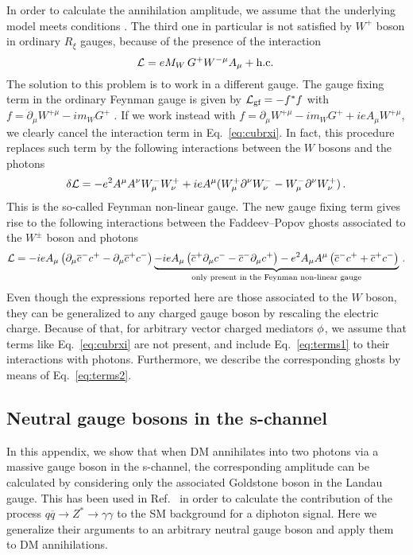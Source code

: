 In order to calculate the annihilation amplitude, we assume that the underlying model meets conditions \cond. The third one in particular is not satisfied by $W^+$ boson in ordinary $R_\xi$ gauges, because of the presence of the interaction
\begin{equation}
{\cal L} =  e M_W\, G^+ W^{-\mu} A_\mu+ \text{h.c.}\,
\label{eq:cubrxi}
\end{equation}
The solution to this problem is to work in a different gauge. The gauge fixing term in the ordinary Feynman gauge is given by ${\cal L}_\text{gf} =- f^*f$ with $f = \partial_\mu W^{+\mu} -  i m_W G^+$ . If we work instead with $f = \partial_\mu W^{+\mu} -  i  m_W G^+  + ie A_\mu W^{+\mu}$, we clearly cancel the interaction term in Eq.~\eqref{eq:cubrxi}. In fact, this procedure replaces such term by the following interactions between the $W$ bosons and the photons
\begin{equation}
\delta {\cal L}= 
%
 - e^2 A^\mu A^\nu  W^-_\mu W^+_\nu
%
+i  e A^\mu ( W^+_\mu \partial^\nu W^-_\nu-  W^-_\mu \partial^\nu W^+_\nu)\,.
\label{eq:terms1}
\end{equation}
This is the so-called Feynman non-linear gauge. The new gauge fixing term gives rise to the following interactions between the Faddeev--Popov ghosts associated to the $W^\pm$ boson and photons~\cite{Pasukonis:2007fu}
%
\begin{equation}
{\cal L} =
-ie A_\mu\left(\partial_\mu \overline{c}^-c^+-
\partial_\mu \overline{c}^+ c^-\right)
\underbrace{-ie A_\mu\left( \overline{c}^+\partial_\mu c^-
- \overline{c}^-\partial_\mu c^+\right)
- e^2 A_\mu A^\mu \left(\overline{c}^- c^++\overline{c}^+ c^-\right)}_\text{only present in the Feynman non-linear gauge}\,.
\label{eq:terms2}
\end{equation}
Even though the expressions reported here are those associated to the $W$ boson, they can be generalized to any charged gauge boson by rescaling the electric charge. Because of that, for arbitrary vector charged mediators ${\phi}$, we assume that terms like Eq.~\eqref{eq:cubrxi} are not present, and include Eq.~\eqref{eq:terms1} to their interactions with photons. Furthermore, we describe the corresponding ghosts by means of Eq.~\eqref{eq:terms2}.

\subsection{Neutral gauge bosons in the s-channel }
In this appendix, we show that when DM annihilates into two photons via a massive gauge boson in the s-channel, the corresponding
amplitude can be calculated by considering only the associated Goldstone boson in the Landau gauge. This has been used 
in Ref.~\cite{Moretti:2014rka} in order to calculate the contribution of the process $q\overline{q} \to Z^* \to \gamma \gamma$
to the SM background for a diphoton signal. Here we generalize their arguments to an arbitrary neutral gauge boson and apply them to DM annihilations. 


